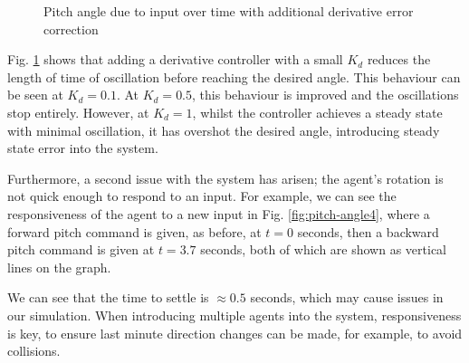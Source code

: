 \documentclass[12pt]{article}
\begin{document}
\begin{figure}[H]
\begin{subfigure}{.4\textwidth}
    \end{subfigure}
    \caption{Pitch angle due to input over time with additional derivative error correction}
    \label{fig:pitch-angle3}
\end{figure}

Fig. \ref{fig:pitch-angle3} shows that adding a derivative controller with a small $K_d$ reduces the length of time of oscillation before reaching the desired angle. This behaviour can be seen at $K_d = 0.1$. At $K_d = 0.5$, this behaviour is improved and the oscillations stop entirely. However, at $K_d = 1$, whilst the controller achieves a steady state with minimal oscillation, it has overshot the desired angle, introducing steady state error into the system.

Furthermore, a second issue with the system has arisen; the agent's rotation is not quick enough to respond to an input. For example, we can see the responsiveness of the agent to a new input in Fig. \ref{fig:pitch-angle4}, where a forward pitch command is given, as before, at $t = 0$ seconds, then a backward pitch command is given at $t = 3.7$ seconds, both of which are shown as vertical lines on the graph.

We can see that the time to settle is $\approx 0.5$ seconds, which may cause issues in our simulation. When introducing multiple agents into the system, responsiveness is key, to ensure last minute direction changes can be made, for example, to avoid collisions.
\end{document}
